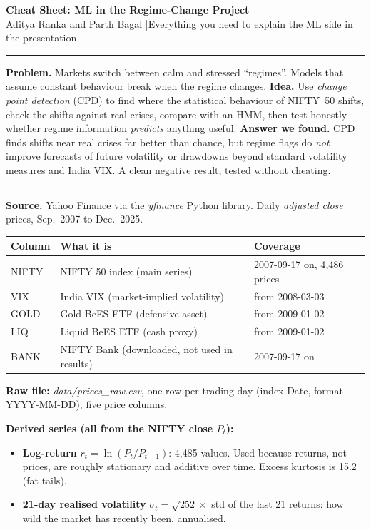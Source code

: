 \documentclass[10pt]{article}
\newcommand{\h}[1]{\vspace{4pt}{\large\bfseries #1}\par\vspace{1pt}\hrule\vspace{3pt}}
\begin{document}
{\LARGE\bfseries Cheat Sheet: ML in the Regime-Change Project}\\[2pt]
{\small Aditya Ranka and Parth Bagal \quad|\quad Everything you need to explain the ML side in the presentation}

\h{1. The 60-second story}
\textbf{Problem.} Markets switch between calm and stressed ``regimes''. Models that assume constant behaviour break when the regime changes.
\textbf{Idea.} Use \emph{change point detection} (CPD) to find where the statistical behaviour of NIFTY~50 shifts, check the shifts against real crises, compare with an HMM, then test honestly whether regime information \emph{predicts} anything useful.
\textbf{Answer we found.} CPD finds shifts near real crises far better than chance, but regime flags do \emph{not} improve forecasts of future volatility or drawdowns beyond standard volatility measures and India VIX. A clean negative result, tested without cheating.

\h{2. The data feed and dataset structure}
\textbf{Source.} Yahoo Finance via the \textit{yfinance} Python library. Daily \emph{adjusted close} prices, Sep.\ 2007 to Dec.\ 2025.

\begin{tabular}{@{}lll@{}}\toprule
Column & What it is & Coverage\\\midrule
NIFTY & NIFTY 50 index (main series) & 2007-09-17 on, 4{,}486 prices\\
VIX & India VIX (market-implied volatility) & from 2008-03-03\\
GOLD & Gold BeES ETF (defensive asset) & from 2009-01-02\\
LIQ & Liquid BeES ETF (cash proxy) & from 2009-01-02\\
BANK & NIFTY Bank (downloaded, not used in results) & 2007-09-17 on\\\bottomrule
\end{tabular}

\textbf{Raw file:} \textit{data/prices\_raw.csv}, one row per trading day (index Date, format YYYY-MM-DD), five price columns.

\textbf{Derived series (all from the NIFTY close $P_t$):}
\begin{itemize}
\item \textbf{Log-return} $r_t=\ln(P_t/P_{t-1})$: 4{,}485 values. Used because returns, not prices, are roughly stationary and additive over time. Excess kurtosis is 15.2 (fat tails).
\item \textbf{21-day realised volatility} $\sigma_t=\sqrt{252}\times$ std of the last 21 returns: how wild the market has recently been, annualised.
\end{itemize}
\end{document}
